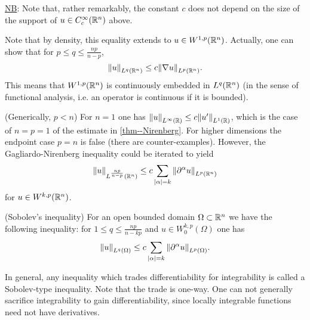 \documentclass[11pt]{article}
\begin{document}
    		\noindent\underline{NB}: Note that, rather remarkably, the constant $c$ does not depend on the size of the support of $u\in C^\infty_c(\mathbb{R}^n)$ above.
    
    		\begin{remark}
    			Note that by density, this equality extends to $u\in W^{1,p}(\mathbb{R}^n)$. Actually, one can show that for $p\le q\le\frac{np}{n-p}$,
    			\begin{equation*}
    				\norm{u}_{L^q(\mathbb{R}^n)}\le c\norm{\nabla u}_{L^p(\mathbb{R}^n)}.
    			\end{equation*}
    			This means that $W^{1,p}(\mathbb{R}^n)$ is continuously embedded in $L^q(\mathbb{R}^n)$ (in the sense of functional analysis, i.e. an operator is continuous if it is bounded).
    		\end{remark}
    
    		\begin{remark}\label{rem--pn}(Generically, $p<n$)
    			For $n=1$ one has $\norm{u}_{L^\infty(\mathbb{R})}\le c\norm{u^\prime}_{L^1(\mathbb{R})}$, which is the case of $n=p=1$ of the estimate in \autoref{thm--Nirenberg}. For higher dimensions the endpoint case $p=n$ is false (there are counter-examples). However, the Gagliardo-Nirenberg inequality could be iterated to yield 
    			\begin{equation*}
    				\norm{u}_{L^{\frac{np}{n-p}}(\mathbb{R}^n)}\le c\sum_{|\alpha|=k}\norm{\partial^\alpha u}_{L^p(\mathbb{R}^n)}
    			\end{equation*}
    			for $u\in W^{k,p}(\mathbb{R}^n)$.
    		\end{remark}
    
    		\begin{cor}
    			(Sobolev's inequality) For an open bounded domain $\Omega\subset\mathbb{R}^n$ we have the following inequality: for $1\le q\le\frac{np}{n-kp}$ and $u\in W^{k,p}_0(\Omega)$ one has
    			\begin{equation*}
    				\norm{u}_{L^q(\Omega)}\le c\sum_{|\alpha|=k}\norm{\partial^\alpha u}_{L^p(\Omega)}.
    			\end{equation*}
    		\end{cor}
    
    		\begin{remark}
    			In general, any inequality which trades differentiability for integrability is called a Sobolev-type inequality. Note that the trade is one-way. One can not generally sacrifice integrability to gain differentiability, since locally integrable functions need not have derivatives.
    		\end{remark}
    
\end{document}
